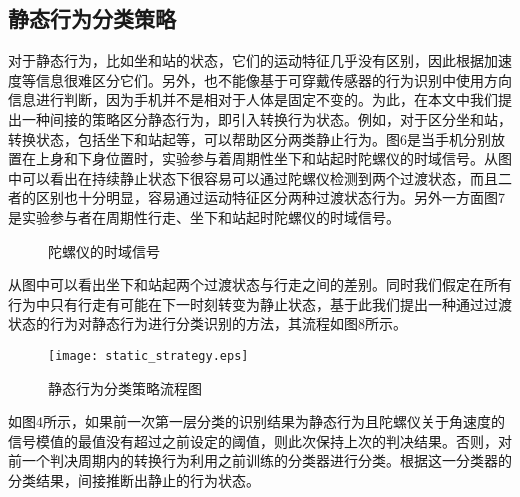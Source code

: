 \subsection{静态行为分类策略}



\par 对于静态行为，比如坐和站的状态，它们的运动特征几乎没有区别，因此根据加速度等信息很难区分它们。另外，也不能像基于可穿戴传感器的行为识别中使用方向信息进行判断，因为手机并不是相对于人体是固定不变的。为此，在本文中我们提出一种间接的策略区分静态行为，即引入转换行为状态。例如，对于区分坐和站，转换状态，包括坐下和站起等，可以帮助区分两类静止行为。图6是当手机分别放置在上身和下身位置时，实验参与着周期性坐下和站起时陀螺仪的时域信号。从图中可以看出在持续静止状态下很容易可以通过陀螺仪检测到两个过渡状态，而且二者的区别也十分明显，容易通过运动特征区分两种过渡状态行为。另外一方面图7是实验参与者在周期性行走、坐下和站起时陀螺仪的时域信号。

\begin{figure}[!htb]
    \centering
    \caption{陀螺仪的时域信号}
\end{figure}

从图中可以看出坐下和站起两个过渡状态与行走之间的差别。同时我们假定在所有行为中只有行走有可能在下一时刻转变为静止状态，基于此我们提出一种通过过渡状态的行为对静态行为进行分类识别的方法，其流程如图8所示。

\begin{figure}[!htp]
\centering
\texttt{[image: static\_strategy.eps]}
\caption{静态行为分类策略流程图}
\end{figure}

\par 如图4所示，如果前一次第一层分类的识别结果为静态行为且陀螺仪关于角速度的信号模值的最值没有超过之前设定的阈值，则此次保持上次的判决结果。否则，对前一个判决周期内的转换行为利用之前训练的分类器进行分类。根据这一分类器的分类结果，间接推断出静止的行为状态。

